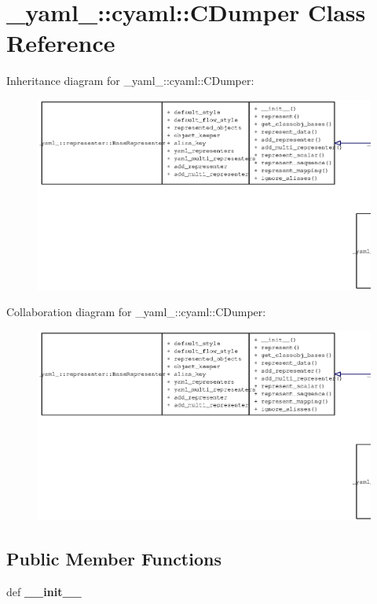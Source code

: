 \section{\_\-yaml\_\-::cyaml::CDumper Class Reference}
\label{class__yaml___1_1cyaml_1_1CDumper}
Inheritance diagram for \_\-yaml\_\-::cyaml::CDumper:\nopagebreak
\begin{figure}[H]
\begin{center}
\leavevmode
\includegraphics[width=400pt]{class__yaml___1_1cyaml_1_1CDumper__inherit__graph}
\end{center}
\end{figure}
Collaboration diagram for \_\-yaml\_\-::cyaml::CDumper:\nopagebreak
\begin{figure}[H]
\begin{center}
\leavevmode
\includegraphics[width=400pt]{class__yaml___1_1cyaml_1_1CDumper__coll__graph}
\end{center}
\end{figure}
\subsection*{Public Member Functions}
\begin{CompactItemize}
\item 
def {\bf \_\-\_\-init\_\-\_\-}
\end{CompactItemize}


